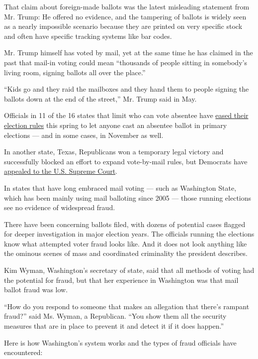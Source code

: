 That claim about foreign-made ballots was the latest misleading
statement from Mr. Trump: He offered no evidence, and the tampering of
ballots is widely seen as a nearly impossible scenario because they are
printed on very specific stock and often have specific tracking systems
like bar codes.

Mr. Trump himself has voted by mail, yet at the same time he has claimed
in the past that mail-in voting could mean ``thousands of people sitting
in somebody's living room, signing ballots all over the place.''

``Kids go and they raid the mailboxes and they hand them to people
signing the ballots down at the end of the street,'' Mr. Trump said in
May.

Officials in 11 of the 16 states that limit who can vote absentee have
\href{https://www.nytimes3xbfgragh.onion/2020/05/21/us/vote-by-mail-trump.html}{eased
their election rules} this spring to let anyone cast an absentee ballot
in primary elections --- and in some cases, in November as well.

In another state, Texas, Republicans won a temporary legal victory and
successfully blocked an effort to expand vote-by-mail rules, but
Democrats have
\href{https://www.texastribune.org/2020/06/16/texas-vote-by-mail/}{appealed
to the U.S. Supreme Court}.

In states that have long embraced mail voting --- such as Washington
State, which has been mainly using mail balloting since 2005 --- those
running elections see no evidence of widespread fraud.

There have been concerning ballots filed, with dozens of potential cases
flagged for deeper investigation in major election years. The officials
running the elections know what attempted voter fraud looks like. And it
does not look anything like the ominous scenes of mass and coordinated
criminality the president describes.

Kim Wyman, Washington's secretary of state, said that all methods of
voting had the potential for fraud, but that her experience in
Washington was that mail ballot fraud was low.

``How do you respond to someone that makes an allegation that there's
rampant fraud?'' said Ms. Wyman, a Republican. ``You show them all the
security measures that are in place to prevent it and detect it if it
does happen.''

Here is how Washington's system works and the types of fraud officials
have encountered:


